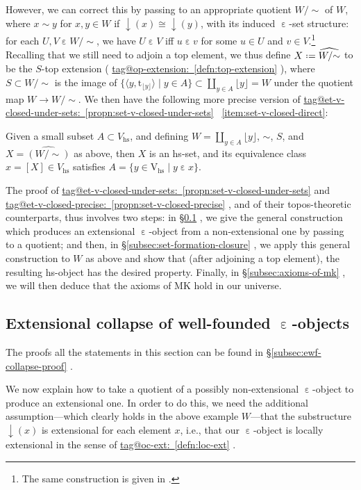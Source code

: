 \documentclass{amsart}
\makeatletter
\newcommand\alttext{\texorpdfstring}
\newcommand\br[1]{\langle{}#1\rangle{}}
\newcommand\defeq{\mathrel{\vcenter{\baselineskip0.5ex \lineskiplimit0pt \hbox{.}\hbox{.}}} =}
\newcommand\dwnfn{{\downarrow}}
\newcommand\ein{\mathrel{\varepsilon}}
\newcommand\floor[2][]{#1\lfloor #2 #1\rfloor}
\newcommand\hs{\mathrm{hs}}
\newcommand\rt{\mathrm{t}}
\newcommand\rV{\mathrm{V}}
\newcommand\set[2][]{#1\{ #2 #1\}}
\newcommand\unein{{\ein}}
\newcommand\unsim{{\sim}}
\newcommand\wh[1]{\widehat{#1}}
\newcommand\tagword[1]{\csname tag@#1\endcsname}
\def\label@tag#1:#2\@nil{#1}
\newcommand\labeltag[1]{\label@tag#1:\@nil}
\newcommand\jref[1]{%
  \texorpdfstring%
    {\hyperref[#1]{\tagword{\labeltag{#1}}~\ref*{#1}}}%
    {\tagword{\labeltag{#1}}~\ref*{#1}}%
}
\newcommand\prerefpost[3]{%
  \texorpdfstring%
    {\hyperref[#2]{#1\ref*{#2}#3}}%
    {#1\ref*{#2}#3}%
}
\newcommand\sref[1]{\prerefpost{\S}{#1}{}}
\theoremstyle{definition}
\theoremstyle{remark}
\theoremstyle{plainwithref}
\newenvironment{settybox}{\begin{tcolorbox}[colback=blue!20,breakable%
    ,enhanced%
    ,sharp corners%
    ,frame hidden%
    ,boxsep=0pt
    ,left=5pt,right=5pt,top=5pt,bottom=5pt
    ,enlarge left by=-5pt,width=\linewidth+10pt
    ,enlarge top by=5pt,enlarge bottom by=5pt
    ,before skip balanced=0pt,after skip balanced=0pt
    ]}{\end{tcolorbox}}
\makeatother
\begin{document}
However, we can correct this by passing to an appropriate quotient \( W / \unsim \) of \( W \), where \( x \sim y \) for \( x,y \in W \) if \( \dwnfn(x) \cong \dwnfn(y) \), with its induced \( \unein \)-set structure: for each \( U,V \ein W / \unsim \), we have \( U \ein V \) iff \( u \ein v \) for some \( u \in U \) and \( v \in V \).\footnote{%
  The same construction is given in \cite[Lemma~8.28]{shulman-comparing}.
}
Recalling that we still need to adjoin a top element, we thus define \( X \defeq \wh{W / \unsim} \) to be the \( S \)-top extension (\jref{defn:top-extension}), where \( S \subset W / \unsim \) is the image of \( \set{ \br{y, \rt_{\floor{y}}} \mid y \in A} \subset \coprod_{y \in A} \floor{y} = W \) under the quotient map \( W \to W / \unsim \).
We then have the following more precise version of \jref{propn:set-v-closed-under-sets}~\ref{item:set-v-closed-direct}:
\begin{settybox}
  \begin{propn} \label{propn:set-v-closed-precise}
    Given a small subset \( A \subset V_{\hs} \), and defining \( W = \coprod_{y \in A}\floor{y} \), \( \unsim \), \( S \), and \( X = \wh{(W / \unsim)} \) as above, then \( X \) is an hs-set, and its equivalence class \( x = [X] \in V_{\hs} \) satisfies \( A = \set{y \in \rV_\hs \mid y \ein x} \).
  \end{propn}
\end{settybox}

The proof of \jref{propn:set-v-closed-under-sets} and \jref{propn:set-v-closed-precise}, and of their topos-theoretic counterparts, thus involves two steps: in \sref{subsec:ewf-collapse}, we give the general construction which produces an extensional \( \unein \)-object from a non-extensional one by passing to a quotient; and then, in \sref{subsec:set-formation-closure}, we apply this general construction to \( W \) as above and show that (after adjoining a top element), the resulting hs-object has the desired property.
Finally, in \sref{subsec:axioms-of-mk}, we will then deduce that the axioms of MK hold in our universe.

\subsection{Extensional collapse of well-founded \alttext{\( \unein \)}{ε}-objects} \label{subsec:ewf-collapse}
The proofs all the statements in this section can be found in \sref{subsec:ewf-collapse-proof}.

We now explain how to take a quotient of a possibly non-extensional \( \unein \)-object to produce an extensional one.
In order to do this, we need the additional assumption---which clearly holds in the above example \( W \)---that the substructure \( \dwnfn(x) \) is extensional for each element \( x \), i.e., that our \( \unein \)-object is locally extensional in the sense of \jref{defn:loc-ext}.
\end{document}
